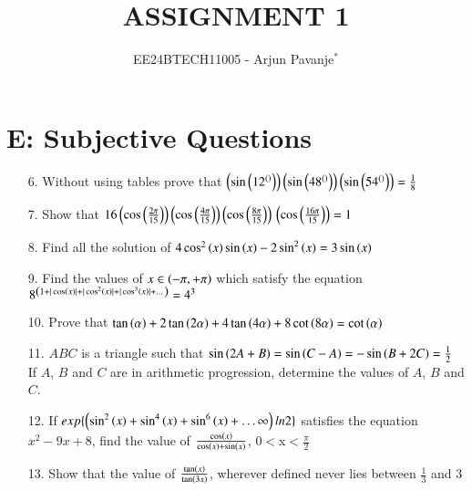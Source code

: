\documentclass[journal,12pt,article,twocolumn]{IEEEtran}
\theoremstyle{remark}
\begin{document}

\vspace{3cm}

\title{ASSIGNMENT 1}
\author{EE24BTECH11005 - Arjun Pavanje$^{*}$%
}
\maketitle
\newpage
\bigskip
\section*{\textbf{\large {E: Subjective Questions}}}
\begin{enumerate}
\item[6.] Without using tables prove that $\brak{\sin\brak{12^{\brak{}}}}\brak{\sin\brak{48^{\brak{}}}}\brak{\sin\brak{54^{\brak{}}}}= \frac{1}{8}$\\
\strut\hfill {}
\item[7.] Show that $16\brak{\cos\brak{\frac{2\pi}{15}}}\brak{\cos\brak{\frac{4\pi}{15}}}\brak{\cos\brak{\frac{8\pi}{15}}}\\\brak{\cos\brak{\frac{16\pi}{15}}}=1$\\
\strut\hfill{}
\item[8.] Find all the solution of $4\cos^2\brak{x} \sin \brak{x} -2\sin^2\brak{x} = 3\sin \brak{x}$
\strut\hfill{}
\item[9.] Find the values of $x \in \brak{-\pi, +\pi}$ which satisfy the equation
$8^{\brak{1+|\cos \brak{x}|+|\cos^2\brak{x}|+|\cos^3\brak{x}|+\dots}}= 4^3$\\
\strut\hfill{}
\item[10.] Prove that $\tan \brak{\alpha}+2\tan \brak{2\alpha}+4\tan \brak{4\alpha}+8\cot \brak{8\alpha}=\cot \brak{\alpha}$\\
\strut\hfill{}
\item[11.] $ABC$ is a triangle such that $\sin{\brak{2A+B}}=\sin{\brak{C-A}}=-\sin{\brak{B+2C}}=\frac{1}{2}$ If $A$, $B$ and $C$ are in arithmetic progression, determine the values of $A$, $B$ and $C$.\\
\strut\hfill{}
\item[12.] If $exp \{\brak{\sin^2\brak{x}+\sin^4\brak{x}+\sin^6\brak{x}+\dots\infty}ln2\}$ satisfies the equation $x^2-9x+8$, find the value of $\frac{\cos \brak{x}}{\cos \brak{x} + \sin \brak{x}}$, 0$<$x$<$$\frac{\pi}{2}$\\
\strut\hfill{}
\item[13.] Show that the value of  $\frac{\tan \brak{x}}{\tan \brak{3x}}$, wherever defined never lies between $\frac{1}{3}$ and 3\\
$$
\end{enumerate}
\end{document}
